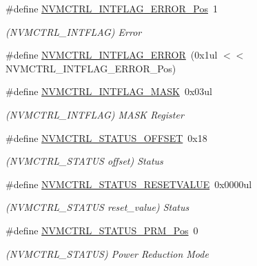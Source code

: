 \begin{DoxyCompactItemize}
\item 
\#define \mbox{\hyperlink{group___s_a_m_d21___n_v_m_c_t_r_l_gad0ee9e136df1b894499ee13b6509c08f}{N\+V\+M\+C\+T\+R\+L\+\_\+\+I\+N\+T\+F\+L\+A\+G\+\_\+\+E\+R\+R\+O\+R\+\_\+\+Pos}}~1
\begin{DoxyCompactList}\small\item\em (N\+V\+M\+C\+T\+R\+L\+\_\+\+I\+N\+T\+F\+L\+AG) Error \end{DoxyCompactList}\item 
\#define \mbox{\hyperlink{group___s_a_m_d21___n_v_m_c_t_r_l_ga4dc7bd2f8228424f2f305284a0425d64}{N\+V\+M\+C\+T\+R\+L\+\_\+\+I\+N\+T\+F\+L\+A\+G\+\_\+\+E\+R\+R\+OR}}~(0x1ul $<$$<$ N\+V\+M\+C\+T\+R\+L\+\_\+\+I\+N\+T\+F\+L\+A\+G\+\_\+\+E\+R\+R\+O\+R\+\_\+\+Pos)
\item 
\#define \mbox{\hyperlink{group___s_a_m_d21___n_v_m_c_t_r_l_ga77cb82e875b1988ba35455d842df74c5}{N\+V\+M\+C\+T\+R\+L\+\_\+\+I\+N\+T\+F\+L\+A\+G\+\_\+\+M\+A\+SK}}~0x03ul
\begin{DoxyCompactList}\small\item\em (N\+V\+M\+C\+T\+R\+L\+\_\+\+I\+N\+T\+F\+L\+AG) M\+A\+SK Register \end{DoxyCompactList}\item 
\#define \mbox{\hyperlink{group___s_a_m_d21___n_v_m_c_t_r_l_gaa210cb991451778d9df1a804b189799a}{N\+V\+M\+C\+T\+R\+L\+\_\+\+S\+T\+A\+T\+U\+S\+\_\+\+O\+F\+F\+S\+ET}}~0x18
\begin{DoxyCompactList}\small\item\em (N\+V\+M\+C\+T\+R\+L\+\_\+\+S\+T\+A\+T\+US offset) Status \end{DoxyCompactList}\item 
\#define \mbox{\hyperlink{group___s_a_m_d21___n_v_m_c_t_r_l_gac30e36e00c486c218383a4d318fe59c8}{N\+V\+M\+C\+T\+R\+L\+\_\+\+S\+T\+A\+T\+U\+S\+\_\+\+R\+E\+S\+E\+T\+V\+A\+L\+UE}}~0x0000ul
\begin{DoxyCompactList}\small\item\em (N\+V\+M\+C\+T\+R\+L\+\_\+\+S\+T\+A\+T\+US reset\+\_\+value) Status \end{DoxyCompactList}\item 
\#define \mbox{\hyperlink{group___s_a_m_d21___n_v_m_c_t_r_l_gab7f1c04b15d3c4fc8c9ab4bfbfd0731c}{N\+V\+M\+C\+T\+R\+L\+\_\+\+S\+T\+A\+T\+U\+S\+\_\+\+P\+R\+M\+\_\+\+Pos}}~0
\begin{DoxyCompactList}\small\item\em (N\+V\+M\+C\+T\+R\+L\+\_\+\+S\+T\+A\+T\+US) Power Reduction Mode \end{DoxyCompactList}\item 
$$
\end{DoxyCompactItemize}
